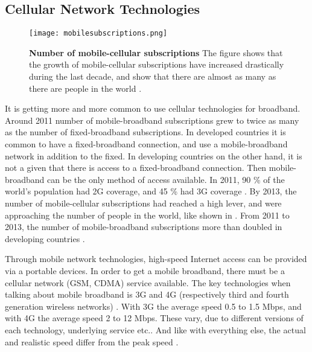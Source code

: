 \subsection{Cellular Network Technologies}

\begin{figure}[b]
  \centering
      \texttt{[image: mobilesubscriptions.png]}
  \caption [Number of mobile-cellular subscriptions]{\textbf{Number of mobile-cellular subscriptions} The figure shows that the growth of mobile-cellular subscriptions have increased drastically during the last decade, and show that there are almost as many as there are people in the world \cite{itu2013}.}
  \label{fig:subscribers}
\end{figure}

It is getting more and more common to use cellular technologies for broadband. Around 2011 number of mobile-broadband subscriptions grew to twice as many as the number of fixed-broadband subscriptions. In developed countries it is common to have a fixed-broadband connection, and use a mobile-broadband network in addition to the fixed. In developing countries on the other hand, it is not a given that there is access to a fixed-broadband connection. Then mobile-broadband can be the only method of access available. In 2011, 90 \% of the world's population had 2G coverage, and 45 \% had 3G coverage \cite{itu2011}. By 2013, the number of mobile-cellular subscriptions had reached a high lever, and were approaching the number of people in the world, like shown in . From 2011 to 2013, the number of mobile-broadband  subscriptions more than doubled in developing countries \cite{itu2013}. 

Through mobile network technologies, high-speed Internet access can be provided via a portable devices. In order to get a mobile broadband, there must be a cellular network (GSM, CDMA) service available. The key technologies when talking about mobile broadband is 3G and 4G (respectively third and fourth generation wireless networks) \cite{mobilebroadband}. With 3G the average speed 0.5 to 1.5 Mbps, and with 4G the average speed 2 to 12 Mbps. These vary, due to different versions of each technology, underlying service etc.. And like with everything else, the actual and realistic speed differ from the peak speed \cite{3gvs4g}. 


